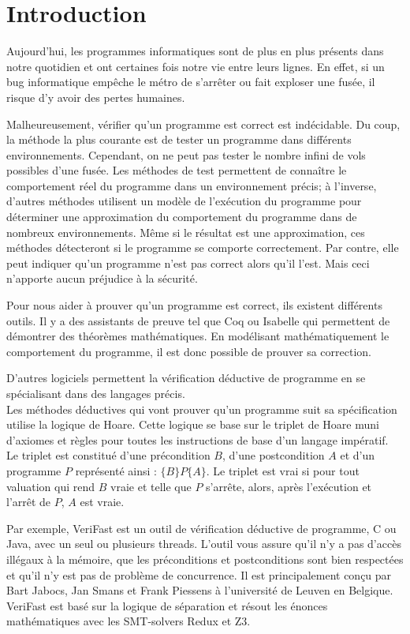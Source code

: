 \documentclass[9pt]{book}
\newcommand{\verifast}{VeriFast}
\begin{document}
\chapter*{Introduction}
		Aujourd'hui, les programmes informatiques sont de plus en plus pr\'esents dans notre quotidien et ont certaines fois notre vie entre leurs lignes. En effet, si un bug informatique emp\^eche le m\'etro de s'arr\^eter ou fait exploser une fus\'ee, il risque d'y avoir des pertes humaines. \par
		Malheureusement, v\'erifier qu'un programme est correct est ind\'ecidable. Du coup, la m\'ethode la plus courante est de tester un programme dans diff\'erents environnements. Cependant, on ne peut pas tester le nombre infini de vols possibles d'une fus\'ee. Les m\'ethodes de test permettent de conna\^itre le comportement r\'eel du programme dans un environnement pr\'ecis; \`a l'inverse, d'autres m\'ethodes utilisent un mod\`ele de l'ex\'ecution du programme pour d\'eterminer une approximation du comportement du programme dans de nombreux environnements. M\^eme si le r\'esultat est une approximation, ces m\'ethodes d\'etecteront si le programme se comporte correctement. Par contre, elle peut indiquer qu'un programme n'est pas correct alors qu'il l'est. Mais ceci n'apporte aucun pr\'ejudice \`a la s\'ecurit\'e.
\par 

		Pour nous aider \`a prouver qu'un programme est correct, ils existent diff\'erents outils. Il y a des assistants de preuve tel que Coq ou Isabelle qui permettent de d\'emontrer des th\'eor\`emes math\'ematiques. En mod\'elisant math\'ematiquement le comportement du programme, il est donc possible de prouver sa correction. \par
		
	D'autres logiciels permettent la v\'erification d\'eductive de programme en se sp\'ecialisant dans des langages pr\'ecis. \\Les m\'ethodes d\'eductives qui vont prouver qu'un programme suit sa sp\'ecification utilise la logique de Hoare. Cette logique se base sur le triplet de Hoare muni d'axiomes et r\`egles pour toutes les instructions de base d'un langage imp\'eratif. Le triplet est constitu\'e d'une pr\'econdition $B$, d'une postcondition $A$ et d'un programme $P$ repr\'esent\'e ainsi : $\{B\}P\{A\}$. Le triplet est vrai si pour tout valuation qui rend $B$ vraie et telle que $P$ s'arr\^ete, alors, apr\`es l'ex\'ecution et l'arr\^et de $P$, $A$ est vraie.\par Par exemple, \verifast{} est un outil de v\'erification d\'eductive de programme, C ou Java, avec un seul ou plusieurs threads. L'outil vous assure qu'il n'y a pas d'acc\`es ill\'egaux \`a la m\'emoire, que les pr\'econditions et postconditions sont bien respect\'ees et qu'il n'y est pas de probl\`eme de concurrence. Il est principalement con\c{c}u par Bart Jabocs, Jan Smans et Frank Piessens \`a l'universit\'e de Leuven en Belgique. \verifast{} est bas\'e sur la logique de s\'eparation et r\'esout les \'enonces math\'ematiques avec les SMT-solvers Redux et Z3.\par
	
\end{document}
